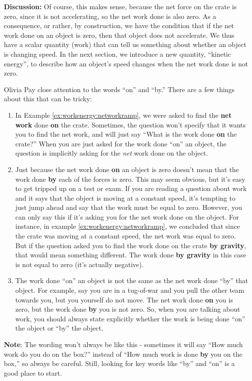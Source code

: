 \begin{example}
\textbf{Discussion:} Of course, this makes sense, because the net force on the crate is zero, since it is not accelerating, so the net work done is also zero. As a consequence, or rather, by construction, we have the condition that if the net work done on an object is zero, then that object does not accelerate. We thus have a scalar quantity (work) that can tell us something about whether an object is changing speed. In the next section, we introduce a new quantity, ``kinetic energy'', to describe how an object's speed changes when the net work done is not zero.
\end{example}

\newpage
\begin{studentOpinion}{Olivia} Pay close attention to the words ``on'' and ``by.'' There are a few things about this that can be tricky:
\begin{enumerate}
\item In Example \ref{ex:workenergy:networkramp}, we were asked to find the \textbf{net work} done \textbf{on} the crate. Sometimes, the question won't specify that it wants you to find the net work, and will just say ``What is the work done \textbf{on} the crate?'' When you are just asked for the work done ``on'' an object, the question is implicitly asking for the \textit{net} work done on the object. \\

\item Just because the net work done \textbf{on} an object is zero doesn't mean that the work done \textbf{by} each of the forces is zero. This may seem obvious, but it's easy to get tripped up on a test or exam. If you are reading a question about work and it says that the object is moving at a constant speed, it's tempting to just jump ahead and say that the work must be equal to zero. However, you can only say this if it's asking you for the net work done on the object. For instance, in example \ref{ex:workenergy:networkramp}, we concluded that since the crate was moving at a constant speed, the net work was equal to zero. But if the question asked you to find the work done on the crate \textbf{by gravity}, that would mean something different. The work done \textbf{by gravity} in this case is not equal to zero (it's actually negative). \\

\item The work done ``on'' an object is not the same as the net work done ``by'' that object. For example, say you are in a tug-of-war and you pull the other team towards you, but you yourself do not move. The net work done \textbf{on} you is zero, but the work done \textbf{by} you is not zero. So, when you are talking about work, you should always state explicitly whether the work is being done ``on'' the object or ``by'' the object. 
\end{enumerate}
\textbf{Note}: The wording won't always be like this - sometimes it will say ``How much work do you do on the box?'' instead of ``How much work is done \textbf{by} you on the box,'' so always be careful. Still, looking for key words like ``by'' and ``on'' is a good place to start. 
\end{studentOpinion}

